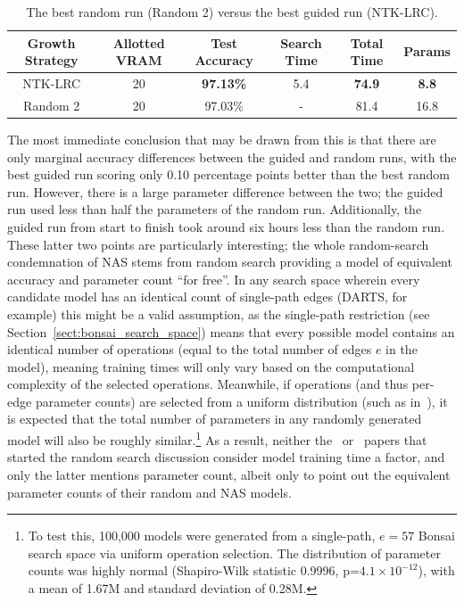 \begin{table}[ht!]
\begin{center}
\begin{tabular}{c|c|c|c|c|c}
    Growth Strategy & Allotted VRAM & Test Accuracy    & Search Time  & Total Time & Params \\
    \hline
    NTK-LRC         & 20       & \textbf{97.13\%} & 5.4          & \textbf{74.9}       & \textbf{8.8}    \\
    Random 2        & 20       & 97.03\%          & -            & 81.4       & 16.8 \\
\end{tabular}
\end{center}
\caption[The best random run versus the best guided run]{The best random run (Random 2) versus the best guided run (NTK-LRC).}
\label{tab:spider_rand2}
\end{table}


The most immediate conclusion that may be drawn from this is that there are only marginal accuracy differences between
the guided and random runs, with the best guided run scoring only 0.10 percentage points better than the best random run.
However, there is a large parameter difference between the two; the guided run used less than half the parameters of the
random run. Additionally, the guided run from start to finish took around six hours less than the random run. These latter
two points are particularly interesting; the whole random-search condemnation of NAS stems from random search providing
a model of equivalent accuracy and parameter count ``for free''. In any search space wherein every candidate model
has an identical count of single-path edges (DARTS, for example) this
might be a valid assumption, as the single-path restriction (see Section~\ref{sect:bonsai_search_space}) means that every
possible model contains an identical number of operations (equal to the total number of edges $e$ in the model),
meaning training times will only vary based on the computational complexity of the selected operations. Meanwhile, if
operations (and thus per-edge parameter counts) are selected from a uniform distribution (such as in~\cite{li2019}),
it is expected that the total number of parameters in any randomly generated model will also be roughly similar.\footnote{
To test this, 100,000 models were generated from a single-path, $e=57$  Bonsai search space via uniform operation selection.
    The distribution of parameter counts was highly normal (Shapiro-Wilk statistic 0.9996, p=$4.1\times 10^{-12}$),
    with a mean of 1.67M and standard deviation of 0.28M.} As a result, neither the~\cite{yu2019} or~\cite{li2019} papers
that started the random search discussion consider model training time a factor, and only the
latter mentions parameter count, albeit only to point out the equivalent parameter counts of their random and NAS models.

